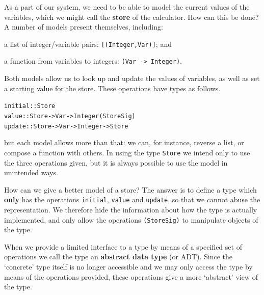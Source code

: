 As a part of our system, we need to
be able to model the current values of the variables, which we might call the
\textbf{store} of the calculator. How can this be done? A number of models
present themselves, including:
\begin{titemize}
\item a list of integer/variable pairs: \texttt{[(Integer,Var)]}; and
\item a function from variables to integers: \texttt{(Var -> Integer)}.
\end{titemize}
Both models allow us to look up and update the values of variables, as well
as set a starting value for the store. These operations have types as
follows. 
\begin{alltt}
initial :: Store
value   :: Store -> Var -> Integer  \hfill(StoreSig)
update  :: Store -> Var -> Integer -> Store
\end{alltt}
but each model
allows more than that: we can, for instance, reverse a list, or compose a
function with others. In using the type \texttt{Store} we intend
only to use the three operations given, but it is always possible to use the
model in unintended ways.

How can we give a better model of a store? The answer is to define a
type which \textbf{only} has the operations \texttt{initial}, \texttt{value} and
\texttt{update}, so that we cannot abuse the representation. We
therefore hide the information about how the type is actually
implemented, and only allow the operations \texttt{(StoreSig)} to manipulate objects
of the type. 

When we provide a limited interface to a type by means of a specified set
of operations we call the type an \textbf{abstract data type} (or ADT).
Since the
`concrete' type itself is no longer accessible and we
may only access the type by
means of the operations provided, these operations give a more `abstract'
view of the type.

